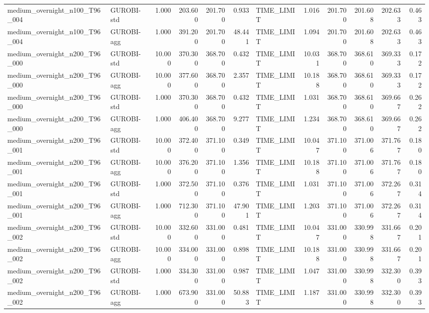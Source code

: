 \begin{table}[htbp]
\begin{tabular}{llrrrrlrrrrr}
medium\_overnight\_n100\_T96\_004 & GUROBI-std & 1.000 & 203.600 & 201.700 & 0.933 & TIME\_LIMIT & 1.016 & 201.700 & 201.608 & 202.633 & 0.463 \\
medium\_overnight\_n100\_T96\_004 & GUROBI-agg & 1.000 & 391.200 & 201.700 & 48.441 & TIME\_LIMIT & 1.094 & 201.700 & 201.608 & 202.633 & 0.463 \\
medium\_overnight\_n200\_T96\_000 & GUROBI-std & 10.000 & 370.300 & 368.700 & 0.432 & TIME\_LIMIT & 10.031 & 368.700 & 368.610 & 369.333 & 0.172 \\
medium\_overnight\_n200\_T96\_000 & GUROBI-agg & 10.000 & 377.600 & 368.700 & 2.357 & TIME\_LIMIT & 10.188 & 368.700 & 368.610 & 369.333 & 0.172 \\
medium\_overnight\_n200\_T96\_000 & GUROBI-std & 1.000 & 370.300 & 368.700 & 0.432 & TIME\_LIMIT & 1.031 & 368.700 & 368.610 & 369.667 & 0.262 \\
medium\_overnight\_n200\_T96\_000 & GUROBI-agg & 1.000 & 406.400 & 368.700 & 9.277 & TIME\_LIMIT & 1.234 & 368.700 & 368.610 & 369.667 & 0.262 \\
medium\_overnight\_n200\_T96\_001 & GUROBI-std & 10.000 & 372.400 & 371.100 & 0.349 & TIME\_LIMIT & 10.047 & 371.100 & 371.006 & 371.767 & 0.180 \\
medium\_overnight\_n200\_T96\_001 & GUROBI-agg & 10.000 & 376.200 & 371.100 & 1.356 & TIME\_LIMIT & 10.188 & 371.100 & 371.006 & 371.767 & 0.180 \\
medium\_overnight\_n200\_T96\_001 & GUROBI-std & 1.000 & 372.500 & 371.100 & 0.376 & TIME\_LIMIT & 1.031 & 371.100 & 371.006 & 372.267 & 0.314 \\
medium\_overnight\_n200\_T96\_001 & GUROBI-agg & 1.000 & 712.300 & 371.100 & 47.901 & TIME\_LIMIT & 1.203 & 371.100 & 371.006 & 372.267 & 0.314 \\
medium\_overnight\_n200\_T96\_002 & GUROBI-std & 10.000 & 332.600 & 331.000 & 0.481 & TIME\_LIMIT & 10.047 & 331.000 & 330.998 & 331.667 & 0.201 \\
medium\_overnight\_n200\_T96\_002 & GUROBI-agg & 10.000 & 334.000 & 331.000 & 0.898 & TIME\_LIMIT & 10.188 & 331.000 & 330.998 & 331.667 & 0.201 \\
medium\_overnight\_n200\_T96\_002 & GUROBI-std & 1.000 & 334.300 & 331.000 & 0.987 & TIME\_LIMIT & 1.047 & 331.000 & 330.998 & 332.300 & 0.393 \\
medium\_overnight\_n200\_T96\_002 & GUROBI-agg & 1.000 & 673.900 & 331.000 & 50.883 & TIME\_LIMIT & 1.187 & 331.000 & 330.998 & 332.300 & 0.393 \\

\end{tabular}
\end{table}
